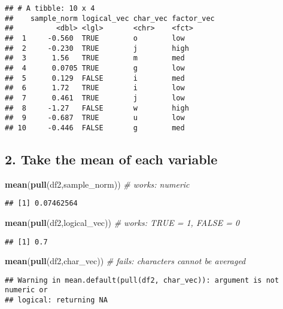 \documentclass[
]{article}
\newenvironment{Shaded}{\begin{snugshade}}{\end{snugshade}}
\newcommand{\CommentTok}[1]{\textcolor[rgb]{0.56,0.35,0.01}{\textit{#1}}}
\newcommand{\FunctionTok}[1]{\textcolor[rgb]{0.13,0.29,0.53}{\textbf{#1}}}
\newcommand{\NormalTok}[1]{#1}
\begin{document}
\begin{verbatim}
## # A tibble: 10 x 4
##    sample_norm logical_vec char_vec factor_vec
##          <dbl> <lgl>       <chr>    <fct>     
##  1     -0.560  TRUE        o        low       
##  2     -0.230  TRUE        j        high      
##  3      1.56   TRUE        m        med       
##  4      0.0705 TRUE        g        low       
##  5      0.129  FALSE       i        med       
##  6      1.72   TRUE        i        low       
##  7      0.461  TRUE        j        low       
##  8     -1.27   FALSE       w        high      
##  9     -0.687  TRUE        u        low       
## 10     -0.446  FALSE       g        med
\end{verbatim}

\subsection{2. Take the mean of each
variable}\label{take-the-mean-of-each-variable}

\begin{Shaded}
\begin{Highlighting}[]
\FunctionTok{mean}\NormalTok{(}\FunctionTok{pull}\NormalTok{(df2,sample\_norm))   }\CommentTok{\# works: numeric}
\end{Highlighting}
\end{Shaded}

\begin{verbatim}
## [1] 0.07462564
\end{verbatim}

\begin{Shaded}
\begin{Highlighting}[]
\FunctionTok{mean}\NormalTok{(}\FunctionTok{pull}\NormalTok{(df2,logical\_vec))  }\CommentTok{\# works: TRUE = 1, FALSE = 0}
\end{Highlighting}
\end{Shaded}

\begin{verbatim}
## [1] 0.7
\end{verbatim}

\begin{Shaded}
\begin{Highlighting}[]
\FunctionTok{mean}\NormalTok{(}\FunctionTok{pull}\NormalTok{(df2,char\_vec))      }\CommentTok{\# fails: characters cannot be averaged}
\end{Highlighting}
\end{Shaded}

\begin{verbatim}
## Warning in mean.default(pull(df2, char_vec)): argument is not numeric or
## logical: returning NA
\end{verbatim}
\end{document}
